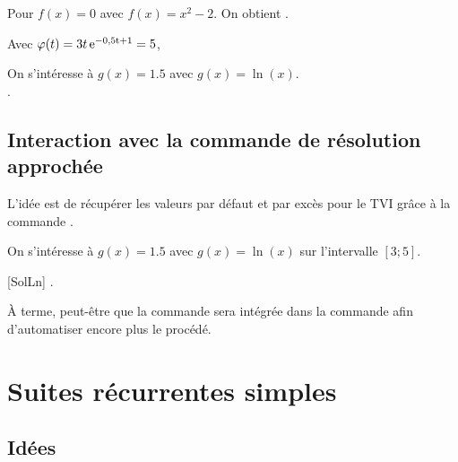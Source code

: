 \begin{PresCodePL}{}
Pour $f(x)=0$ avec $f(x)=x^2-2$. On obtient .
\end{PresCodePL}

\begin{PresCodePL}{}
Avec $\varphi(t)=3t\,\rm{e}^{-0,5t+1}=5$,
\end{PresCodePL}

\begin{PresCodePL}{}
On s'intéresse à $g(x)=\num{1,5}$ avec $g(x)=\ln(x)$.\\
.
\end{PresCodePL}

\subsection{Interaction avec la commande de résolution approchée}

\begin{tipblock}
 L'idée est de récupérer les valeurs par défaut et par excès pour le TVI grâce à la commande .
\end{tipblock}

\begin{PresCodePL}{}
On s'intéresse à $g(x)=\num{1,5}$ avec $g(x)=\ln(x)$ sur l'intervalle $\left[3;5\right]$.

[SolLn]
.
\end{PresCodePL}

\begin{noteblock}
À terme, peut-être que la commande  sera intégrée dans la commande  afin d'automatiser encore plus le procédé.
\end{noteblock}

\newpage

\section{Suites récurrentes simples}\label{calcrecurr}

\subsection{Idées}

